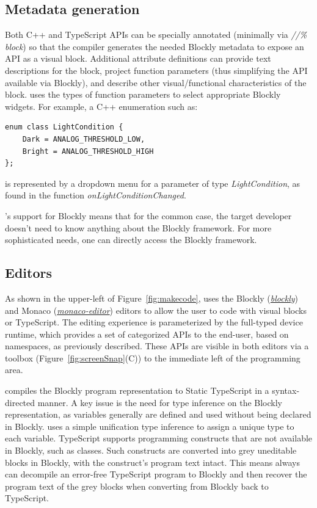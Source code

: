 \subsection{Metadata generation}

Both C++ and TypeScript APIs can be specially annotated (minimally via
\emph{//\% block}) so that the \MC compiler generates the needed
Blockly metadata to expose an API as a visual block.
Additional attribute definitions can provide text descriptions for the block, project function
parameters (thus simplifying the API available via Blockly), and describe other visual/functional
characteristics of the block.  \MC uses the types of function parameters to select appropriate
Blockly widgets.  For example, a C++ enumeration such as:
\begin{lstlisting}
enum class LightCondition {
    Dark = ANALOG_THRESHOLD_LOW,
    Bright = ANALOG_THRESHOLD_HIGH
};
\end{lstlisting}
is represented by a dropdown menu for a parameter of type \emph{LightCondition}, as found in
the function \emph{onLightConditionChanged}.
 
\MCN's support for Blockly means that for the common case, the target developer doesn't need
to know anything about the Blockly framework.
For more sophisticated needs, one can directly access the Blockly framework.

\subsection{Editors}

As shown in the upper-left of Figure~\ref{fig:makecode},
\MC uses the Blockly (\emph{\href{https://github.com/google/blockly}{blockly}}) and Monaco
(\emph{\href{https://github.com/Microsoft/monaco-editor}{monaco-editor}}) editors to allow the user to code with
visual blocks or TypeScript. The editing experience is parameterized by the full-typed device
runtime, which provides a set of categorized APIs to the end-user, based on namespaces, as
previously described. These APIs are visible in both editors via a toolbox (Figure~\ref{fig:screenSnap}(C))
to the immediate left of the programming area. 

\MC compiles the Blockly program representation to Static TypeScript in a syntax-directed manner.
A key issue is the need for type inference on the Blockly representation, as variables generally are defined and used without
being declared in Blockly. \MC uses a simple unification type inference to assign a
unique type to each variable.
TypeScript supports programming constructs that are not available in Blockly, such as classes.
Such constructs are converted into grey uneditable blocks in Blockly, with the construct's program
text intact. This means \MC always can decompile an error-free TypeScript program to Blockly and then recover
the program text of the grey blocks when converting from Blockly back to TypeScript.

